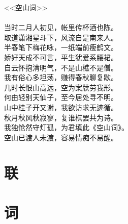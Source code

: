 \documentclass[12pt,a4paper]{article}
\begin{document}
\begin{center}
<<空山词>>\\
\qquad\\
当时二月人初见，帐里传杯酒也陈。\\
取道潇湘星斗下，风流自是南来人。\\
半春笔下梅花咏，一纸端前瘦鹤文。\\
娇好天成不可言，平生犹爱系腰裙。\\
自云怀抱清明气，不是山樵不是僧。\\
我有俗心多坦荡，赚得春秋聊复歇。\\
几时长恨山高远，空为案牍劳我形。\\
何由轻别天仙子，至今居处寻不明。\\
山中桂子开又谢，我欲访求无迹循。\\
秋月秋风秋寂寥，复谁棋罢共为诗。\\
我独怆然守灯孤，为君填此《空山词》。\\
空山已渡人未渡，容易情痴不易醒。\\
\end{center}

\newpage
\section*{联}

\newpage
\section*{词}
\end{document}
